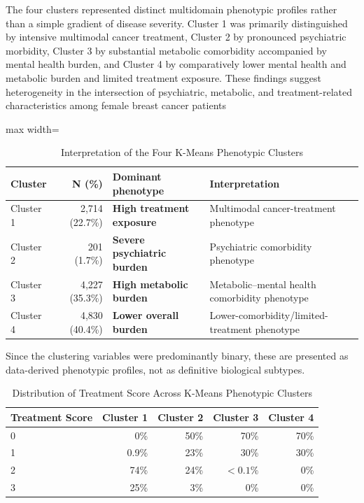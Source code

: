 \documentclass[11pt]{article}
\begin{document}
The four clusters represented distinct multidomain phenotypic profiles rather than a simple gradient of disease severity. Cluster 1 was primarily distinguished by intensive multimodal cancer treatment, Cluster 2 by pronounced psychiatric morbidity, Cluster 3 by substantial metabolic comorbidity accompanied by mental health burden, and Cluster 4 by comparatively lower mental health and metabolic burden and limited treatment exposure. These findings suggest heterogeneity in the intersection of psychiatric, metabolic, and treatment-related characteristics among female breast cancer patients

\begin{table}[H]
\centering
\caption{Interpretation of the Four K-Means Phenotypic Clusters}
\label{tab:cluster_interpretation}
\begin{adjustbox}{max width=\textwidth}
\begin{tabular}{l r p{4.2cm} p{6.0cm}}
\toprule
\textbf{Cluster} & \textbf{N (\%)} & \textbf{Dominant phenotype} & \textbf{Interpretation} \\
\midrule
Cluster 1 & 2,714 (22.7\%) &
\textbf{High treatment exposure} &
Multimodal cancer-treatment phenotype \\

Cluster 2 & 201 (1.7\%) &
\textbf{Severe psychiatric burden} &
Psychiatric comorbidity phenotype \\

Cluster 3 & 4,227 (35.3\%) &
\textbf{High metabolic burden} &
Metabolic--mental health comorbidity phenotype \\

Cluster 4 & 4,830 (40.4\%) &
\textbf{Lower overall burden} &
Lower-comorbidity/limited-treatment phenotype \\
\bottomrule
\end{tabular}
\end{adjustbox}
\end{table}

Since the clustering variables were predominantly binary, these are presented as data-derived phenotypic profiles, not as definitive biological subtypes.

\begin{table}[H]
\centering
\caption{Distribution of Treatment Score Across K-Means Phenotypic Clusters}
\label{tab:treatment_score_clusters}
\begin{tabular}{lrrrr}
\hline
\textbf{Treatment Score} & \textbf{Cluster 1} & \textbf{Cluster 2} & \textbf{Cluster 3} & \textbf{Cluster 4} \\
\hline
0 & 0\% & 50\% & 70\% & 70\% \\
1 & 0.9\% & 23\% & 30\% & 30\% \\
2 & 74\% & 24\% & $<0.1\%$ & 0\% \\
3 & 25\% & 3\% & 0\% & 0\% \\
\hline
\end{tabular}
\end{table}
\end{document}

